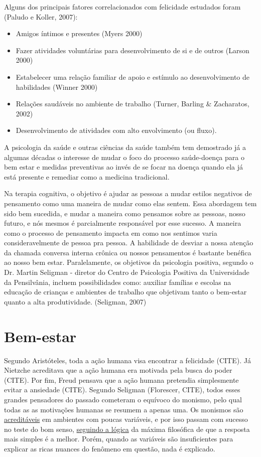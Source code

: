 Alguns dos principais fatores correlacionados com felicidade estudados foram (Paludo e Koller, 2007):

\begin{itemize}
    \item Amigos íntimos e presentes (Myers 2000)
    \item Fazer atividades voluntárias para desenvolvimento de si e de outros (Larson 2000)
    \item Estabelecer uma relação familiar de apoio e estímulo ao desenvolvimento de habilidades (Winner 2000)
    \item Relações saudáveis no ambiente de trabalho (Turner, Barling \& Zacharatos, 2002)
    \item Desenvolvimento de atividades com alto envolvimento (ou fluxo).
\end{itemize}

A psicologia da saúde e outras ciências da saúde também tem demostrado já a algumas décadas o interesse de mudar o foco do processo saúde-doença para o bem estar e medidas preventivas ao invés de se focar na doença quando ela já está presente e remediar como a medicina tradicional.

Na terapia cognitiva, o objetivo é ajudar as pessoas a mudar estilos negativos de pensamento como uma maneira de mudar como elas sentem. Essa abordagem tem sido bem sucedida, e mudar a maneira como pensamos sobre as pessoas, nosso futuro, e nós mesmos é parcialmente responsável por esse sucesso. A maneira como o processo de pensamento impacta em como nos sentimos varia consideravelmente de pessoa pra pessoa. A habilidade de desviar a nossa atenção da chamada conversa interna crônica ou nossos pensamentos é bastante benéfica ao nosso bem estar. Paralelamente, os objetivos da psicologia positiva, segundo o Dr. Martin Seligman - diretor do Centro de Psicologia Positiva da Universidade da Pensilvânia, incluem  possibilidades como: auxiliar famílias e escolas na educação de crianças e ambientes de trabalho que objetivam tanto o bem-estar quanto a alta produtividade. (Seligman, 2007)

\chapter{Bem-estar}

Segundo Aristóteles, toda a ação humana visa encontrar a felicidade (CITE). Já Nietzche acreditava que a ação humana era motivada pela busca do poder (CITE). Por fim, Freud pensava que a ação humana pretendia simplesmente evitar a ansiedade (CITE). Segundo Seligman (Florescer, CITE), todos esses grandes pensadores do passado cometeram o equívoco do monismo, pelo qual todas as as motivações humanas se resumem a apenas uma. Os monismos são \underline{acreditáveis} em ambientes com poucas variáveis, e por isso passam com sucesso no teste do bom senso, \underline{seguindo a lógica} da máxima filosófica de que a resposta mais simples é a melhor. Porém, quando as variáveis são insuficientes para explicar as ricas nuances do fenômeno em questão, nada é explicado.

